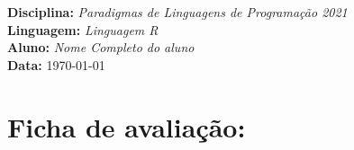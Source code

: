 %


\noindent
\textbf{Disciplina:} \textit{Paradigmas de Linguagens de Programa\c{c}\~{a}o 2021}\\
\textbf{Linguagem:} \textit{Linguagem R}\\
\textbf{Aluno:} \textit{Nome Completo do aluno}\\
\textbf{Data:} \today

\section*{Ficha de avalia\c{c}\~{a}o:}



